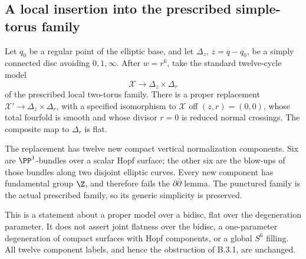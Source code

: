 \subsection{A local insertion into the prescribed simple-torus family}

\begin{proposition}\label{push:src:B.4.15}\label{push:B415}
Let $q_0$ be a regular point of the elliptic base, and let
$\Delta_z$, $z=q-q_0$, be a simply connected disc avoiding
$0,1,\infty$. After $w=r^6$, take the standard twelve-cycle
model
\[
 \mathcal X\longrightarrow\Delta_z\times\Delta_r
\]
of the prescribed local two-torus family. There is a proper
replacement $\mathcal X'\to\Delta_z\times\Delta_r$, with
a specified isomorphism to $\mathcal X$ off $(z,r)=(0,0)$,
whose total fourfold is smooth and whose divisor $r=0$ is
reduced normal crossings. The composite map to $\Delta_r$
is flat.

The replacement has twelve new compact vertical normalization
components. Six are $\PP^1$-bundles over a scalar Hopf
surface; the other six are the blow-ups of those bundles
along two disjoint elliptic curves. Every new component
has fundamental group $\Z$, and therefore fails the
$\partial\bar\partial$ lemma. The punctured family is the
actual prescribed family, so its generic simplicity is
preserved.

This is a statement about a proper model over a bidisc,
flat over the degeneration parameter. It does not assert
joint flatness over the bidisc, a one-parameter degeneration
of compact surfaces with Hopf components, or a global
$S^6$ filling. All twelve component labels, and hence the
obstruction of B.3.1, are unchanged.
\end{proposition}

